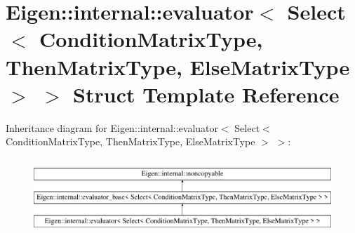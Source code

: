 \hypertarget{struct_eigen_1_1internal_1_1evaluator_3_01_select_3_01_condition_matrix_type_00_01_then_matrix_t0c555ecce04e199df0b1ebada3749ccc}{}\section{Eigen\+::internal\+::evaluator$<$ Select$<$ Condition\+Matrix\+Type, Then\+Matrix\+Type, Else\+Matrix\+Type $>$ $>$ Struct Template Reference}
\label{struct_eigen_1_1internal_1_1evaluator_3_01_select_3_01_condition_matrix_type_00_01_then_matrix_t0c555ecce04e199df0b1ebada3749ccc}
Inheritance diagram for Eigen\+::internal\+::evaluator$<$ Select$<$ Condition\+Matrix\+Type, Then\+Matrix\+Type, Else\+Matrix\+Type $>$ $>$\+:\begin{figure}[H]
\begin{center}
\leavevmode
\includegraphics[height=2.857143cm]{struct_eigen_1_1internal_1_1evaluator_3_01_select_3_01_condition_matrix_type_00_01_then_matrix_t0c555ecce04e199df0b1ebada3749ccc}
\end{center}
\end{figure}
